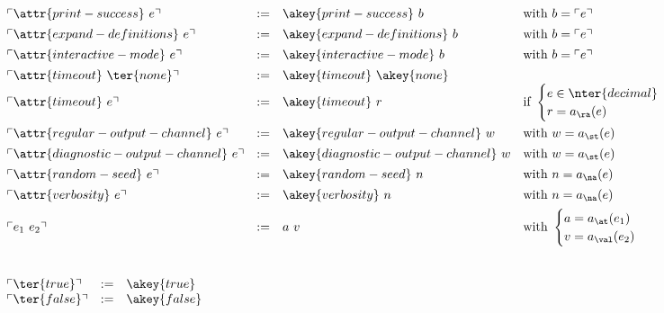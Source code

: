 \(
\begin{array}{llll}
 \tr{\attr{print-success}\ e} & := & \akey{print-success}\ b &
 \text{with } b = \tr{e}
 \\[1ex] 
 \tr{\attr{expand-definitions}\ e} & := & \akey{expand-definitions}\ b &
 \text{with } b = \tr{e}
 \\[1ex] 
 \tr{\attr{interactive-mode}\ e} & := & \akey{interactive-mode}\ b &
 \text{with } b = \tr{e}
 \\[1ex] 
 \tr{\attr{timeout}\ \ter{none}} & := & \akey{timeout}\ \akey{none}
 \\ 
 \tr{\attr{timeout}\ e} & := & \akey{timeout}\ r
 & \text{if } \begin{cases} e \in \nter{decimal}\\ r = a_{\ra}(e)\end{cases}
 \\[3ex] 
 \tr{\attr{regular-output-channel}\ e} & := & \akey{regular-output-channel}\ w
 & \text{with } w = a_{\st}(e)
 \\[1ex] 
 \tr{\attr{diagnostic-output-channel}\ e} & := & \akey{diagnostic-output-channel}\ w
 & \text{with } w = a_{\st}(e)
 \\[1ex] 
 \tr{\attr{random-seed}\ e} & := & \akey{random-seed}\ n
 & \text{with } n = a_{\na}(e)
 \\[1ex] 
 \tr{\attr{verbosity}\ e} & := & \akey{verbosity}\ n
 & \text{with } n = a_{\na}(e)
 \\[1ex] 
 \tr{e_1\ e_2} & := & a\ v
 & \text{with } \begin{cases} a = a_{\at}(e_1)\\ v = a_{\val}(e_2)\end{cases}
 \\[1ex] 
\end{array}
\)
\bigskip

\noindent {} \\

\(
\begin{array}{llll}
 \tr{\ter{true}} & := & \akey{true} \\
 \tr{\ter{false}} & := & \akey{false} 
\end{array}
\)
\bigskip

\noindent {} \\

